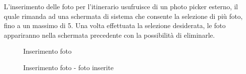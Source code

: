 \documentclass{natourDoc}
\begin{document}
\newpage
L'inserimento delle foto per l'itinerario usufruisce di un photo picker esterno, il quale rimanda ad una schermata di sistema 
che consente la selezione di più foto, fino a un massimo di 5. Una volta effettuata la selezione desiderata, le foto appariranno 
nella schermata precedente con la possibilità di eliminarle.
\begin{figure}[htbp]
	\centering
	\begin{minipage}[t]{0.4\textwidth}
		\caption{Inserimento foto}
	\end{minipage}
	\hfill
	\begin{minipage}[t]{0.4\textwidth}
		\caption{Inserimento foto - foto inserite}
	\end{minipage}
\end{figure}
\end{document}
